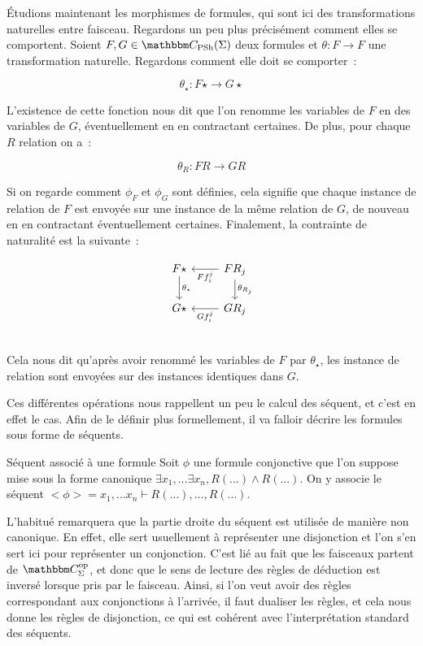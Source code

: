 Étudions maintenant les morphismes de formules, qui sont ici des transformations
naturelles entre faisceau. Regardons un peu plus précisément comment elles se
comportent. Soient $F,G\in\C_\psh(\Sigma)$ deux formules et $\theta:F\rightarrow F$
une transformation naturelle. Regardons comment elle doit se comporter~:

\[ \theta_\star : F\star \rightarrow G\star \]

L'existence de cette fonction nous dit que l'on renomme les variables de $F$ en des
variables de $G$, éventuellement en en contractant certaines. De plus, pour chaque
$R$ relation on a~:

\[ \theta_R : FR\rightarrow GR\]

Si on regarde comment $\phi_F$ et $\phi_G$ sont définies, cela signifie que chaque
instance de relation de $F$ est envoyée sur une instance de la même relation de $G$,
de nouveau en en contractant éventuellement certaines. Finalement, la contrainte
de naturalité est la suivante~:

\[\begin{tikzcd}
    F\star \arrow[d, "\theta_\star"] & FR_j \arrow[l, "Ff_i^j"]
                                            \arrow[d, "\theta_{R_j}"] \\
    G\star & GR_j \arrow[l, "Gf_i^j"] \\
\end{tikzcd}\]

Cela nous dit qu'après avoir renommé les variables de $F$ par $\theta_\star$, les
instance de relation sont envoyées sur des instances identiques dans $G$.

Ces différentes opérations nous rappellent un peu le calcul des séquent, et
c'est en effet le cas. Afin de le définir plus formellement, il va falloir décrire
les formules sous forme de séquents.

\begin{defi}{Séquent associé à une formule}
    Soit $\phi$ une formule conjonctive que l'on suppose mise sous la
    forme canonique $\exists x_1,\dots\exists x_n, R(\dots)\wedge R(\dots)$. On
    y associe le séquent $<\phi> = x_1,\dots x_n\vdash R(\dots), \dots, R(\dots)$.
\end{defi}

\begin{rem}
    L'habitué remarquera que la partie droite du séquent est utilisée de manière non
    canonique. En effet, elle sert usuellement à représenter une disjonction et
    l'on s'en sert ici pour représenter un conjonction. C'est lié au fait que
    les faisceaux partent de $\C_\Sigma^\text{op}$, et donc que le sens de lecture
    des règles de déduction est inversé lorsque pris par le faisceau. Ainsi, si l'on
    veut avoir des règles correspondant aux conjonctions à l'arrivée, il faut dualiser
    les règles, et cela nous donne les règles de disjonction, ce qui est cohérent avec
    l'interprétation standard des séquents.
\end{rem}

